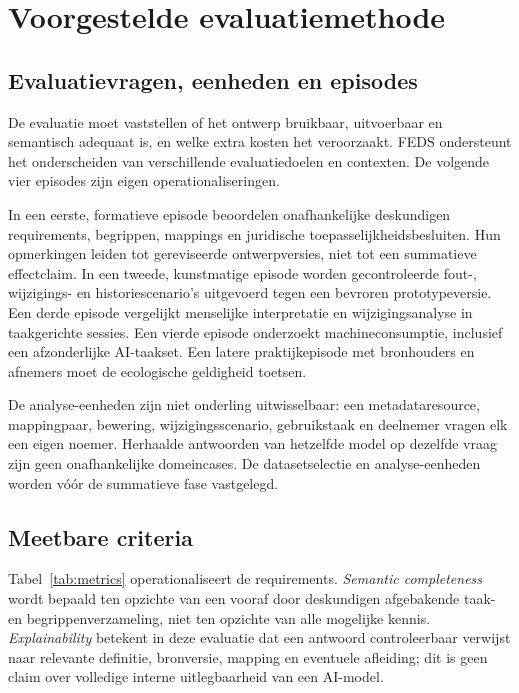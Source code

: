 \section{Voorgestelde evaluatiemethode}
\label{sec:evaluation}
\subsection{Evaluatievragen, eenheden en episodes}
De evaluatie moet vaststellen of het ontwerp bruikbaar, uitvoerbaar en semantisch adequaat is, en welke extra kosten het veroorzaakt. FEDS ondersteunt het onderscheiden van verschillende evaluatiedoelen en contexten. \citep{L03} De volgende vier episodes zijn eigen operationaliseringen.

In een eerste, formatieve episode beoordelen onafhankelijke deskundigen requirements, begrippen, mappings en juridische toepasselijkheidsbesluiten. Hun opmerkingen leiden tot gereviseerde ontwerpversies, niet tot een summatieve effectclaim. In een tweede, kunstmatige episode worden gecontroleerde fout-, wijzigings- en historiescenario’s uitgevoerd tegen een bevroren prototypeversie. Een derde episode vergelijkt menselijke interpretatie en wijzigingsanalyse in taakgerichte sessies. Een vierde episode onderzoekt machineconsumptie, inclusief een afzonderlijke AI-taakset. Een latere praktijkepisode met bronhouders en afnemers moet de ecologische geldigheid toetsen.

De analyse-eenheden zijn niet onderling uitwisselbaar: een metadataresource, mappingpaar, bewering, wijzigingsscenario, gebruikstaak en deelnemer vragen elk een eigen noemer. Herhaalde antwoorden van hetzelfde model op dezelfde vraag zijn geen onafhankelijke domeincases. De datasetselectie en analyse-eenheden worden vóór de summatieve fase vastgelegd.



\subsection{Meetbare criteria}
Tabel~\ref{tab:metrics} operationaliseert de requirements. \emph{Semantic completeness} wordt bepaald ten opzichte van een vooraf door deskundigen afgebakende taak- en begrippenverzameling, niet ten opzichte van alle mogelijke kennis. \emph{Explainability} betekent in deze evaluatie dat een antwoord controleerbaar verwijst naar relevante definitie, bronversie, mapping en eventuele afleiding; dit is geen claim over volledige interne uitlegbaarheid van een AI-model.


